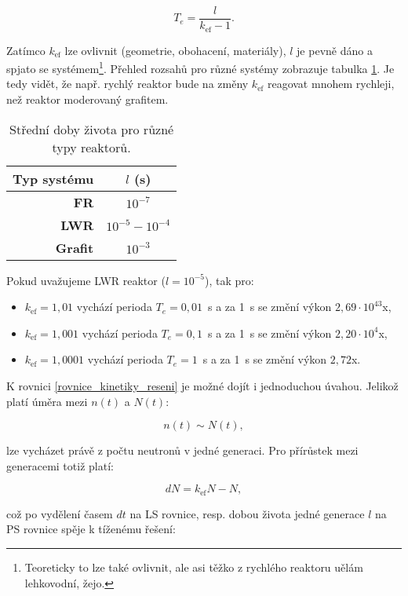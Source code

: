 \begin{equation}
  T_e = \dfrac{l}{k_{\text{ef}} - 1}.
  \label{perioda}
\end{equation}

Zatímco $k_{\text{ef}}$ lze ovlivnit (geometrie, obohacení, materiály), $l$ je pevně dáno a spjato se systémem\footnote{Teoreticky to lze také ovlivnit, ale asi těžko z rychlého reaktoru uělám lehkovodní, žejo.}. Přehled rozsahů pro různé systémy zobrazuje tabulka \ref{table_stredni_doby_zivota}. Je tedy vidět, že např. rychlý reaktor bude na změny $k_{\text{ef}}$ reagovat mnohem rychleji, než reaktor moderovaný grafitem.

\begin{table}[h]
\centering
\caption{Střední doby života pro různé typy reaktorů.}
\label{table_stredni_doby_zivota}
\begin{tabular}{@{}rc@{}}
\toprule
\textbf{Typ systému} & $l$ (s)              \\ \midrule
\textbf{FR}          & $10^{-7}$            \\
\textbf{LWR}         & $10^{-5} - 10^{-4}$  \\
\textbf{Grafit}      & $10^{-3}$            \\ \bottomrule
\end{tabular}
\end{table}

Pokud uvažujeme LWR reaktor ($l = 10^{-5}$), tak pro:

\begin{itemize}
  \item $k_{\text{ef}} = 1,01$ vychází perioda $T_e = 0,01$~s a za 1~s se změní výkon $2,69 \cdot 10^{43}$x,
  \item $k_{\text{ef}} = 1,001$ vychází perioda $T_e = 0,1$~s a za 1~s se změní výkon $2,20 \cdot 10^{4}$x,
  \item $k_{\text{ef}} = 1,0001$ vychází perioda $T_e = 1$~s a za 1~s se změní výkon $2,72$x.
\end{itemize}

K rovnici \eqref{rovnice_kinetiky_reseni} je možné dojít i jednoduchou úvahou. Jelikož platí úměra mezi $n(t)$ a $N(t)$:

$$ n(t) \sim N(t), $$

lze vycházet právě z počtu neutronů v jedné generaci. Pro přírůstek mezi generacemi totiž platí:

$$ dN = k_{\text{ef}}N - N, $$

což po vydělení časem $dt$ na LS rovnice, resp. dobou života jedné generace $l$ na PS rovnice spěje k tíženému řešení:

